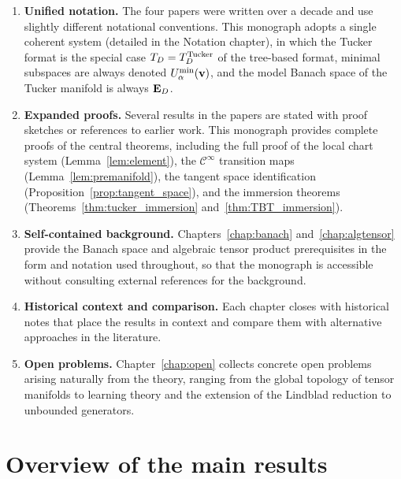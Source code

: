 \begin{enumerate}
\item \textbf{Unified notation.} The four papers were written over a
    decade and use slightly different notational conventions. This
    monograph adopts a single coherent system (detailed in the
    Notation chapter), in which the Tucker format is the special
    case $T_D = T_D^{\mathrm{Tucker}}$ of the tree-based format, minimal subspaces
    are always denoted $U^{\min}_{\alpha}(\mathbf{v})$, and the model Banach
    space of the Tucker manifold is always $\mathbf{E}_{D}$.

\item \textbf{Expanded proofs.} Several results in the papers are stated
    with proof sketches or references to earlier work. This monograph
    provides complete proofs of the central theorems, including the
    full proof of the local chart system (Lemma~\ref{lem:element}),
    the $\mathcal{C}^\infty$ transition maps
    (Lemma~\ref{lem:premanifold}), the tangent space identification
    (Proposition~\ref{prop:tangent_space}), and the immersion theorems
    (Theorems~\ref{thm:tucker_immersion} and~\ref{thm:TBT_immersion}).

\item \textbf{Self-contained background.} Chapters~\ref{chap:banach}
    and~\ref{chap:algtensor} provide the Banach space and algebraic
    tensor product prerequisites in the form and notation used
    throughout, so that the monograph is accessible without consulting
    external references for the background.

\item \textbf{Historical context and comparison.} Each chapter closes
    with historical notes that place the results in context and compare
    them with alternative approaches in the literature.

\item \textbf{Open problems.} Chapter~\ref{chap:open} collects concrete
    open problems arising naturally from the theory, ranging from the
    global topology of tensor manifolds to learning theory and the
    extension of the Lindblad reduction to unbounded generators.
\end{enumerate}

\section{Overview of the main results}
\label{sec:intro:overview}

